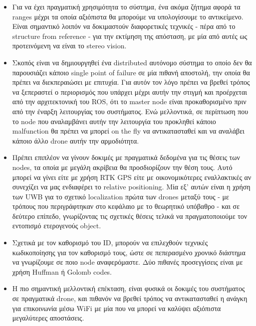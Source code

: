 \begin{itemize}
    \item Για να έχει πραγματική χρησιμότητα το σύστημα, ένα ακόμα ζήτημα αφορά τα ranges μέχρι τα οποία αξιόπιστα θα μπορούμε να υπολογίσουμε το αντικείμενο. Είναι σημαντικό λοιπόν να δοκιμαστούν διαφορετικές τεχνικές - πέρα από το structure from reference - για την εκτίμηση της απόσταση, με μία από αυτές ως
    προτεινόμενη να είναι το stereo vision.
    \item Σκοπός είναι να δημιουργηθεί ένα distributed αυτόνομο σύστημα το οποίο δεν θα παρουσιάζει κάποιο single point of failure σε μία πιθανή αποστολή, την οποία θα πρέπει να διεκπεραιώσει με επιτυχία. Για αυτόν τον λόγο πρέπει να βρεθεί τρόπος να ξεπεραστεί ο περιορισμός που υπάρχει μέχρι αυτήν την στιγμή και προέρχεται από την αρχιτεκτονική του ROS, ότι το master node είναι προκαθορισμένο πριν από την έναρξη λειτουργίας του συστήματος. Ενώ μελλοντικά, σε περίπτωση που το node που αναλαμβάνει αυτήν την λειτουργία του προ\-κλη\-θεί κάποιο malfunction θα πρέπει να μπορεί on the fly να αντικατασταθεί και να αναλάβει κάποιο άλλο drone αυτήν την αρμοδιότητα.
    \item Πρέπει επιπλέον να γίνουν δοκιμές με πραγματικά δεδομένα για τις θέσεις των nodes, τα οποία με μεγάλη ακρίβεια θα προσδιορίζουν την θέση τους. Αυτό μπορεί να γίνει είτε με χρήση RTK GPS είτε με οικονομικότερες εναλλακτικές αν συνεχίζει να μας ενδιαφέρει το relative positioning. Μία εξ' αυτών είναι η χρήση των UWB για το σχετικό localization πρώτα των drones μεταξύ τους - με τρόπους που περιγράφτηκαν στο κεφάλαιο με το θεωρητικό υπόβαθρο - και σε δεύτερο επίπεδο, γνωρίζοντας τις σχετικές θέσεις τελικά να πρα\-γμα\-το\-ποιού\-με τον εντοπισμό ετερογενούς object. 
    \item Σχετικά με τον καθορισμό του ID, μπορούν να επιλεχθούν τεχνικές κω\-δι\-κο\-ποί\-η\-σης για τον καθορισμό τους, ώστε σε πεπερασμένο χρονικό διάστημα να γνωρίζουμε σε ποιο node αναφερόμαστε. Δύο πιθανές προσεγγίσεις είναι με χρήση Huffman ή Golomb codes.
    \item Η πιο σημαντική μελλοντική επέκταση, είναι φυσικά οι δοκιμές του συστήματος σε πραγματικά drone, και πιθανόν να βρεθεί τρόπος να αντικατασταθεί η ανάγκη για επικοινωνία μέσω WiFi με μία που να μπορεί να καλύψει αξιόπιστα μεγαλύτερες αποστάσεις.
  \end{itemize}




